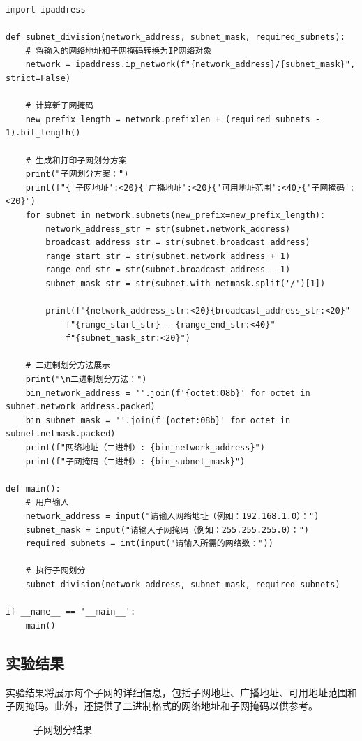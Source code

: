 \documentclass[UTF8,titlepage]{ctexart}
\numberwithin{figure}{section}
\begin{document}
\begin{verbatim}
import ipaddress

def subnet_division(network_address, subnet_mask, required_subnets):
    # 将输入的网络地址和子网掩码转换为IP网络对象
    network = ipaddress.ip_network(f"{network_address}/{subnet_mask}", strict=False)

    # 计算新子网掩码
    new_prefix_length = network.prefixlen + (required_subnets - 1).bit_length()

    # 生成和打印子网划分方案
    print("子网划分方案：")
    print(f"{'子网地址':<20}{'广播地址':<20}{'可用地址范围':<40}{'子网掩码':<20}")
    for subnet in network.subnets(new_prefix=new_prefix_length):
        network_address_str = str(subnet.network_address)
        broadcast_address_str = str(subnet.broadcast_address)
        range_start_str = str(subnet.network_address + 1)
        range_end_str = str(subnet.broadcast_address - 1)
        subnet_mask_str = str(subnet.with_netmask.split('/')[1])

        print(f"{network_address_str:<20}{broadcast_address_str:<20}"
            f"{range_start_str} - {range_end_str:<40}"
            f"{subnet_mask_str:<20}")

    # 二进制划分方法展示
    print("\n二进制划分方法：")
    bin_network_address = ''.join(f'{octet:08b}' for octet in subnet.network_address.packed)
    bin_subnet_mask = ''.join(f'{octet:08b}' for octet in subnet.netmask.packed)
    print(f"网络地址（二进制）: {bin_network_address}")
    print(f"子网掩码（二进制）: {bin_subnet_mask}")

def main():
    # 用户输入
    network_address = input("请输入网络地址（例如：192.168.1.0）：")
    subnet_mask = input("请输入子网掩码（例如：255.255.255.0）：")
    required_subnets = int(input("请输入所需的网络数："))

    # 执行子网划分
    subnet_division(network_address, subnet_mask, required_subnets)

if __name__ == '__main__':
    main()
\end{verbatim}

\subsection{实验结果}
实验结果将展示每个子网的详细信息，包括子网地址、广播地址、可用地址范围和子网掩码。此外，还提供了二进制格式的网络地址和子网掩码以供参考。
\begin{figure}[H]
\centering
 \caption{子网划分结果}
 \label{}
\end{figure}
\clearpage
\end{document}
